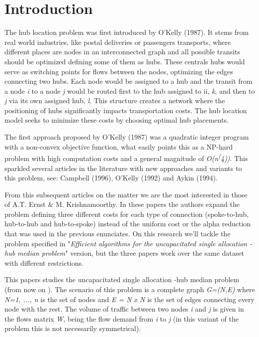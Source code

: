\section{Introduction}

The hub location problem was first introduced by O'Kelly (1987)\cite{OKelly1987}. It stems from real world
industries, like postal deliveries or passengers transports, where different places are nodes in an
interconnected graph and all possible transits should be optimized defining some of them as hubs. These
centrals hubs would serve as switching points for flows between the nodes, optimizing the edges connecting
two hubs. Each node would be assigned to a hub and the transit from a node \emph{i} to a node \emph{j}
would be routed first to the hub assigned to ii, \emph{k}, and then to \emph{j} via its own assigned hub, 
\emph{l}. This structure creates a network where the positioning of hubs significantly 
impacts transportation costs. The hub location model seeks to minimize these costs by choosing optimal hub
placements.

The first approach proposed by O'Kelly (1987)\cite{OKelly1987} was a quadratic integer program with a
non-convex objective function, what easily points this as a NP-hard problem with high computation costs
and a general magnitude of \emph{O(n\textsuperscript(4))}. This sparkled several articles in the literature
with new approaches and variants to this problem, see: Campbell (1996)\cite{Campbell1996}, O'Kelly (1992)
\cite{OKelly1992} and Aykin (1994)\cite{Aykin1994}.

From this subsequent articles on the matter we are the most interested in those of A.T. Ernst \&
M. Krishnamoorthy\cite{Ernst1996}\cite{Ernst1998}\cite{Ernst1999}. In these papers the authors expand
the problem defining three different costs for each type of connection (spoke-to-hub, hub-to-hub and
hub-to-spoke) instead of the uniform cost or the alpha reduction that was used in the previous
enunciates. On this research we'll tackle the problem specified in "\emph{Efficient algorithms for
the uncapacitated single allocation \ip-hub median problem}"\cite{Ernst1996} version, but the three
papers work over the same dataset with different restrictions.

This papers studies the uncapacitated single allocation \ip-hub median problem (from now on
). The scenario of this problem is a complete graph \emph{G=(N,E)} where \emph{N={1, ..., n}} is
the set of nodes and \emph{E = N x N} is the set of edges connecting every node with the rest.
The volume of traffic between two nodes \emph{i} and \emph{j} is given in the flows matrix \emph{W}, 
being \wij the flow demand from \emph{i} to \emph{j} (in this variant of the problem this
is not necessarily symmetrical).

